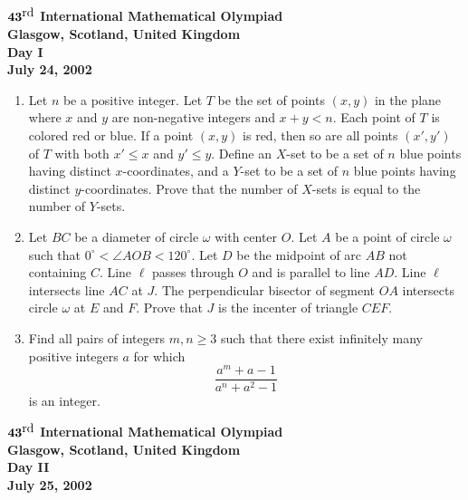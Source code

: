 \documentclass[12pt]{article}
\def\rd{^{\scriptstyle\mbox{rd}}}
\def\ang{\angle}
\def\dg{^\circ}
\begin{document}
\begin{center}
${\bf 43\rd}$ {\bf International Mathematical Olympiad} \\[.1in]
{\bf Glasgow, Scotland, United Kingdom} \\ [.05in]
{\bf Day I%
}\\[.05in]
{\bf July 24, 2002}
\end{center}

\vspace*{.3in}

\begin{enumerate}
\item %
Let $n$ be a positive integer. Let $T$ be the set of points $(x, y)$ in the
plane where $x$ and $y$ are non-negative integers and $x + y < n$.
Each point of $T$ is colored red or blue. If a point $(x, y)$ is red, then
so are all points $(x', y')$ of $T$ with both $x' \le x$ and $y' \le y$.
Define an $X$-set to be a set of $n$ blue points having distinct 
$x$-coordinates, and a $Y$-set to be a set of $n$ blue points having 
distinct $y$-coordinates. Prove that the number of $X$-sets is equal 
to the number of $Y$-sets.

\item %
Let $BC$ be a diameter of circle $\omega$ with center $O$. Let $A$ be a point
of circle $\omega$ such that $0\dg < \ang AOB < 120\dg$. Let $D$ be the midpoint
 of arc $AB$ not containing $C$. Line $\ell$ passes through $O$ and is 
parallel to line $AD$. Line $\ell$ intersects line $AC$ at $J$. 
The perpendicular bisector of segment $OA$ intersects circle $\omega$ at $E$
 and $F$. Prove that $J$ is the incenter of triangle $CEF$.

\item %
Find all pairs of integers $m, n \ge 3$ such that there exist infinitely
many positive integers $a$ for which
\[
\frac{a^m + a - 1}{a^n + a^2 - 1}
\]
is an integer.
\end{enumerate}

\pagebreak %
\begin{center}
${\bf 43\rd}$ {\bf International Mathematical Olympiad} \\[.1in]
{\bf Glasgow, Scotland, United Kingdom} \\ [.05in]
{\bf Day II%
}\\[.05in]
{\bf July 25, 2002}
\end{center}
\end{document}
